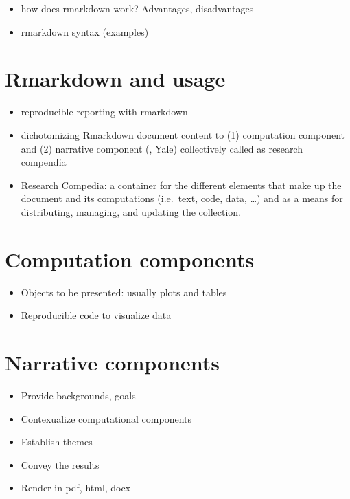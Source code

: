 \documentclass[
]{book}
\providecommand{\tightlist}{%
  \setlength{\itemsep}{0pt}\setlength{\parskip}{0pt}}
\begin{document}
\begin{itemize}
\tightlist
\item
  how does rmarkdown work? Advantages, disadvantages
\item
  rmarkdown syntax (examples)
\end{itemize}

\hypertarget{rmarkdown-and-usage}{%
\section{Rmarkdown and usage}\label{rmarkdown-and-usage}}

\begin{itemize}
\item
  reproducible reporting with rmarkdown
\item
  dichotomizing Rmarkdown document content to (1) computation component and (2) narrative component (\citet{MikeKane}, Yale) collectively called as research compendia
\item
  Research Compedia: a container for the different elements that make up the document and its computations (i.e.~text, code, data, \ldots) and as a means for distributing, managing, and updating the collection.
\end{itemize}

\hypertarget{computation-components}{%
\section{Computation components}\label{computation-components}}

\begin{itemize}
\tightlist
\item
  Objects to be presented: usually plots and tables
\item
  Reproducible code to visualize data
\end{itemize}

\hypertarget{narrative-components}{%
\section{Narrative components}\label{narrative-components}}

\begin{itemize}
\tightlist
\item
  Provide backgrounds, goals
\item
  Contexualize computational components
\item
  Establish themes
\item
  Convey the results
\item
  Render in pdf, html, docx
\end{itemize}
\end{document}
